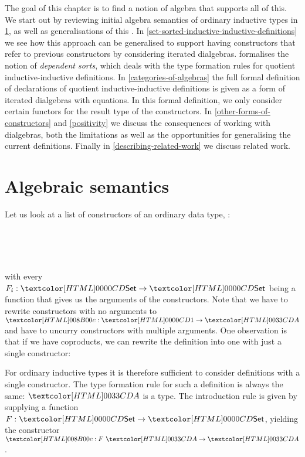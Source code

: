 The goal of this chapter is to find a notion of algebra that supports
all of this. We start out by reviewing initial algebra semantics of
ordinary inductive types in \cref{algebraic-semantics}, as well as
generalisations of this . In
\cref{set-sorted-inductive-inductive-definitions} we see how this
approach can be generalised to support having constructors that refer
to previous constructors by considering iterated
dialgebras.  formalises the notion of
\emph{dependent sorts}, which deals with the type formation rules for
quotient inductive-inductive definitions. In
\cref{categories-of-algebras} the full formal definition of
declarations of quotient inductive-inductive definitions is given as a
form of iterated dialgebras with equations. In this formal definition,
we only consider certain functors for the result type of the
constructors. In \cref{other-forms-of-constructors} and
\cref{positivity} we discuss the consequences of working with
dialgebras, both the limitations as well as the opportunities for
generalising the current definitions. Finally in
\cref{describing-related-work} we discuss related work.

\section{Algebraic semantics}
\label{algebraic-semantics}

Let us look at a list of constructors of an ordinary data type, \eg:
%
\begin{datatype}{\Aty}{\Set}
   \\
   \\
  \constrdots \\
\end{datatype}
%
with every $F_i : \Set \to \Set$ being a function that gives us the
arguments of the constructors. Note that we have to rewrite
constructors with no arguments to $\Ac : \unitty \to \Aty$ and have to
uncurry constructors with multiple arguments. One observation is that
if we have coproducts, we can rewrite the definition into one with
just a single constructor:
%
\begin{datatype}{\Aty}{\Set}
\end{datatype}
%
For ordinary inductive types it is therefore sufficient to consider
definitions with a single constructor. The type formation rule for
such a definition is always the same: $\Aty$ is a type. The
introduction rule is given by supplying a function
$F : \Set \to \Set$, yielding the constructor
$\Ac : F\ \Aty \to \Aty$.

